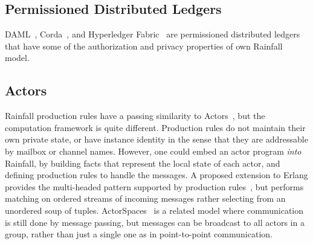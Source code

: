 


\subsection{Permissioned Distributed Ledgers}
\label{s:RelatedPermissioned}
DAML~\cite{DA2019:DAML}, Corda~\cite{Hearn2016:Corda}, and Hyperledger Fabric~\cite{Androulaki2018:Fabric} are permissioned distributed ledgers that have some of the authorization and privacy properties of own Rainfall model.






\subsection{Actors}
Rainfall production rules have a passing similarity to Actors~\cite{Agha92:ActorTheory}, but the computation framework is quite different. Production rules do not maintain their own private state, or have instance identity in the sense that they are addressable by mailbox or channel names. However, one could embed an actor program \emph{into} Rainfall, by building facts that represent the local state of each actor, and defining production rules to handle the messages. A proposed extension to Erlang provides the multi-headed pattern supported by production rules~\cite{Sulzmann2008:MultiHeaded}, but performs matching on ordered streams of incoming messages rather selecting from an unordered soup of tuples. ActorSpaces~\cite{Agha1993:ActorSpace} is a related model where communication is still done by message passing, but messages can be broadcast to all actors in a group, rather than just a single one as in point-to-point communication.

